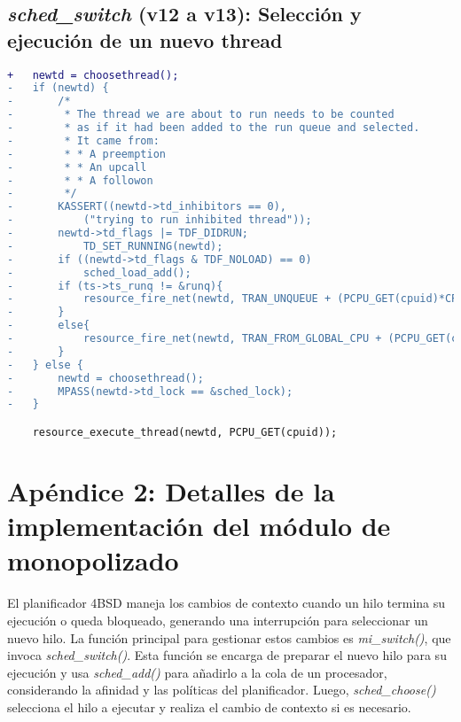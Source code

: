 \subsection{\textit{sched\_switch} (v12 a v13): Selección y ejecución de un nuevo thread}\label{appendix:apA3}

\begin{lstlisting}[language=diff]
+   newtd = choosethread();
-   if (newtd) {
-       /*
-        * The thread we are about to run needs to be counted
-        * as if it had been added to the run queue and selected.
-        * It came from:
-        * * A preemption
-        * * An upcall
-        * * A followon
-        */
-       KASSERT((newtd->td_inhibitors == 0),
-           ("trying to run inhibited thread"));
-       newtd->td_flags |= TDF_DIDRUN;
-           TD_SET_RUNNING(newtd);
-       if ((newtd->td_flags & TDF_NOLOAD) == 0)
-           sched_load_add();
-       if (ts->ts_runq != &runq){
-           resource_fire_net(newtd, TRAN_UNQUEUE + (PCPU_GET(cpuid)*CPU_BASE_TRANSITIONS));
-       }
-       else{
-           resource_fire_net(newtd, TRAN_FROM_GLOBAL_CPU + (PCPU_GET(cpuid)*CPU_BASE_TRANSITIONS));
-       }
-   } else {
-       newtd = choosethread();
-       MPASS(newtd->td_lock == &sched_lock);
-   }

    resource_execute_thread(newtd, PCPU_GET(cpuid));

\end{lstlisting}

\section{Apéndice 2: Detalles de la implementación del módulo de monopolizado}\label{appendix:apB}

El planificador 4BSD maneja los cambios de contexto cuando un hilo termina su ejecución o queda bloqueado, generando una interrupción para seleccionar un nuevo hilo. La función principal para gestionar estos cambios es \textit{mi\_switch()}, que invoca \textit{sched\_switch()}. Esta función se encarga de preparar el nuevo hilo para su ejecución y usa \textit{sched\_add()} para añadirlo a la cola de un procesador, considerando la afinidad y las políticas del planificador. Luego, \textit{sched\_choose()} selecciona el hilo a ejecutar y realiza el cambio de contexto si es necesario.


